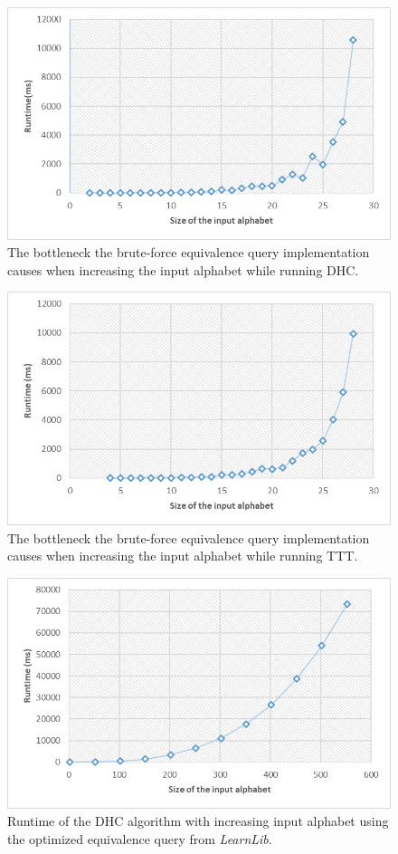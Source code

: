\begin{figure}
	\centering
	\includegraphics[width=0.7\linewidth]{figures/inputruntime}
	\caption{The bottleneck the brute-force equivalence query implementation causes when increasing the input alphabet while running DHC.}
	\label{fig:inputruntime}
\end{figure}

\begin{figure}
	\centering
	\includegraphics[width=0.7\linewidth]{figures/inputruntimettt}
	\caption{The bottleneck the brute-force equivalence query implementation causes when increasing the input alphabet while running TTT.}
	\label{fig:inputruntimettt}
\end{figure}

\begin{figure}
	\centering
	\includegraphics[width=0.7\linewidth]{figures/inputruntimeopt}
	\caption{Runtime of the DHC algorithm with increasing input alphabet using the optimized equivalence query from \emph{LearnLib}.}
	\label{fig:inputruntimeopt}
\end{figure}


